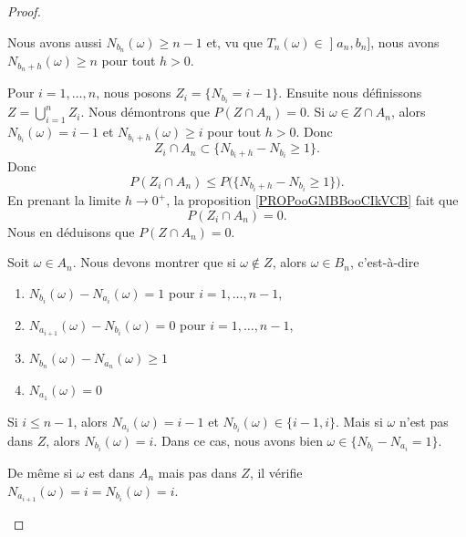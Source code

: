 \begin{proof}
\begin{subproof}
\begin{subproof}
			Nous avons aussi \( N_{b_n}(\omega)\geq n-1\) et, vu que \( T_n(\omega)\in \mathopen] a_n , b_n \mathclose]\), nous avons \( N_{b_n+h}(\omega)\geq n\) pour tout \( h>0\).
		\end{subproof}
		Pour \( i=1,\ldots, n\), nous posons \( Z_i=\{ N_{b_i}=i-1 \}\). Ensuite nous définissons \( Z=\bigcup_{i=1}^nZ_i\). Nous démontrons que \( P(Z\cap A_n)=0\). Si \( \omega\in Z\cap A_n\), alors \( N_{b_i}(\omega)=i-1\) et \( N_{b_i+h}(\omega)\geq i\) pour tout \( h>0\). Donc
		\begin{equation}
			Z_i\cap A_n\subset\{ N_{b_i+h}-N_{b_i}\geq 1 \}.
		\end{equation}
		Donc
		\begin{equation}
			P(Z_i\cap A_n)\leq P\big( \{ N_{b_i+h}-N_{b_i}\geq 1 \} \big).
		\end{equation}
		En prenant la limite \( h\to 0^+\), la proposition \ref{PROPooGMBBooCIkVCB} fait que
		\begin{equation}
			P(Z_i\cap A_n)=0.
		\end{equation}
		Nous en déduisons que \( P(Z\cap A_n)=0\).

		Soit \( \omega\in A_n\). Nous devons montrer que si \( \omega\notin Z\), alors \( \omega\in B_n\), c'est-à-dire
		\begin{enumerate}
			\item
			      $ N_{b_i}(\omega)-N_{a_i}(\omega)=1 $ pour \( i=1,\ldots, n-1\),
			\item
			      $N_{a_{i+1}}(\omega)-N_{b_i}(\omega)=0$ pour \( i=1,\ldots, n-1\),
			\item

			      $N_{b_n}(\omega)-N_{a_n}(\omega)\geq 1$
			\item
			      $N_{a_1}(\omega)=0$
		\end{enumerate}

		Si \( i\leq n-1\), alors \( N_{a_i}(\omega)=i-1\) et \( N_{b_i}(\omega)\in \{ i-1,i \}\). Mais si \( \omega\) n'est pas dans \( Z\), alors \( N_{b_i}(\omega)=i\). Dans ce cas, nous avons bien \( \omega\in\{ N_{b_i}-N_{a_i}=1 \}\).

		De même si \( \omega\) est dans \( A_n\) mais pas dans \( Z\), il vérifie \( N_{a_{i+1}}(\omega)=i= N_{b_i}(\omega)=i\).


\end{subproof}
\end{proof}
